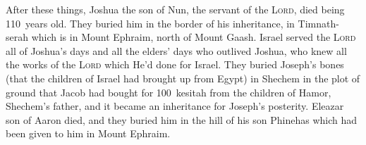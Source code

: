 \begin{inparaenum}
   After these things, Joshua the son of Nun, the servant of the \textsc{Lord}, died being 110~years old.%
   They buried him in the border of his inheritance, in Timnath-serah which is in Mount Ephraim, north of Mount Gaash.%
   Israel served the \textsc{Lord} all of Joshua's days and all the elders' days who outlived Joshua, who knew all the works of the \textsc{Lord} which He'd done for Israel.%
   They buried Joseph's bones (that the children of Israel had brought up from Egypt) in Shechem in the plot of ground that Jacob had bought for 100~kesitah from the children of Hamor, Shechem's father, and it became an inheritance for Joseph's posterity.%
   Eleazar son of Aaron died, and they buried him in the hill of his son Phinehas which had been given to him in Mount Ephraim.%
\end{inparaenum}
